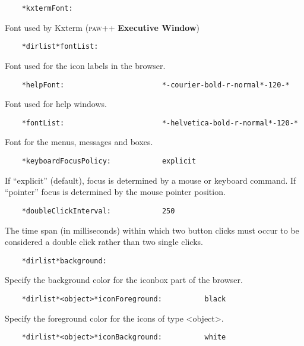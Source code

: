 \documentclass[11pt]{cernman}
\renewcommand{\PAWPP}{\textsc{paw++}\index{PAW++}}
\newcommand{\EW}{{\bf Executive Window}\index{Executive Window}}
\begin{document}
\begin{verbatim}
    *kxtermFont:
\end{verbatim}

   Font used by Kxterm (\PAWPP{} \EW)

\begin{verbatim}
    *dirlist*fontList:
\end{verbatim}

   Font used for the icon labels in the browser.

\begin{verbatim}
    *helpFont:                       *-courier-bold-r-normal*-120-*
\end{verbatim}

   Font used for help windows.

\begin{verbatim}
    *fontList:                       *-helvetica-bold-r-normal*-120-*
\end{verbatim}

   Font for the menus, messages and boxes.

\begin{verbatim}
    *keyboardFocusPolicy:            explicit
\end{verbatim}

   If ``explicit'' (default), focus is determined by a mouse or keyboard
   command. If ``pointer'' focus is determined by the mouse pointer position.

\begin{verbatim}
    *doubleClickInterval:            250
\end{verbatim}

   The time span (in milliseconds) within which two button clicks must occur
   to be considered a double click rather than two single clicks.

\begin{verbatim}
    *dirlist*background:
\end{verbatim}

   Specify the background color for the iconbox part of the browser.

\begin{verbatim}
    *dirlist*<object>*iconForeground:          black
\end{verbatim}

   Specify the foreground color for the icons of type <object>.

\begin{verbatim}
    *dirlist*<object>*iconBackground:          white
\end{verbatim}
\end{document}
